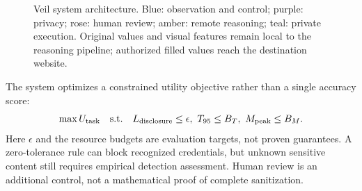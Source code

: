\documentclass[conference]{IEEEtran}
\begin{document}
\begin{figure}[t]
\centering
{}
\caption{Veil system architecture. Blue: observation and control; purple: privacy; rose: human review; amber: remote reasoning; teal: private execution. Original values and visual features remain local to the reasoning pipeline; authorized filled values reach the destination website.}
\label{fig:architecture}
\end{figure}

The system optimizes a constrained utility objective rather than a single accuracy score:
\begin{equation}
 \max U_{\rm task}\quad\text{s.t.}\quad
 L_{\rm disclosure}\leq\epsilon,\ T_{95}\leq B_T,\ M_{\rm peak}\leq B_M.
\end{equation}
Here $\epsilon$ and the resource budgets are evaluation targets, not proven guarantees. A zero-tolerance rule can block recognized credentials, but unknown sensitive content still requires empirical detection assessment. Human review is an additional control, not a mathematical proof of complete sanitization.
\end{document}
